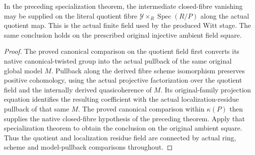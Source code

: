 \begin{theorem}
\label{thm:kn-arithmetic-canonical-quotient-specialization}
\leanok
{}
In the preceding specialization theorem, the intermediate closed-fibre
vanishing may be supplied on the literal quotient fibre
$\mathcal Y\times_R\operatorname{Spec}(R/P)$ along the actual quotient map.
This is the actual finite field used by the produced Witt stage.  The same
conclusion holds on the prescribed original injective ambient field square.
\end{theorem}
\begin{proof}
The proved canonical comparison on the quotient field first converts its
native canonical-twisted group into the actual pullback of the same original
global model $M$.  Pullback along the derived fibre scheme isomorphism
preserves positive cohomology, using the actual projective factorization
over the quotient field and the internally derived quasicoherence of $M$.
Its original-family projection equation identifies the resulting coefficient
with the actual localization-residue pullback of that same $M$.
The proved canonical comparison within $\kappa(P)$ then supplies the native
closed-fibre hypothesis of the preceding theorem.  Apply that specialization
theorem to obtain the conclusion on the original ambient square.  Thus the
quotient and localization residue field are connected by actual ring,
scheme and model-pullback comparisons throughout.
\end{proof}
